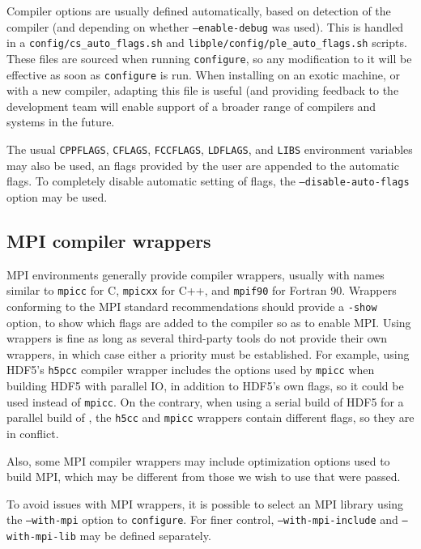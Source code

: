 \documentclass[a4paper,10pt,twoside]{csshortdoc}
\begin{document}
Compiler options are usually defined automatically, based on
detection of the compiler (and depending on whether \texttt{--enable-debug}
was used). This is handled in a \texttt{config/cs\_auto\_flags.sh}
and \texttt{libple/config/ple\_auto\_flags.sh} scripts.
These files are sourced when running \texttt{configure}, so
any modification to it will be effective as soon as \texttt{configure} is run.
When installing on an exotic machine, or with a new compiler, adapting this
file is useful (and providing feedback to the \CS development team
will enable support of a broader range of compilers and systems in the
future.

The usual \texttt{CPPFLAGS}, \texttt{CFLAGS},
\texttt{FCCFLAGS}, \texttt{LDFLAGS}, and \texttt{LIBS} environment variables
may also be used, an flags provided by the user are appended to the automatic
flags. To completely disable automatic setting of flags,
the \texttt{--disable-auto-flags} option may be used.

\subsection{MPI compiler wrappers\label{sec:config:mpicc}}

MPI environments generally provide compiler wrappers, usually
with names similar to \texttt{mpicc} for C, \texttt{mpicxx} for C++,
and \texttt{mpif90} for Fortran 90. Wrappers conforming to the
MPI standard recommendations should provide a \texttt{-show}
option, to show which flags are added to the compiler so as to
enable MPI. Using wrappers is fine as long as several third-party tools
do not provide their own wrappers, in which case either
a priority must be established. For example, using HDF5's
\texttt{h5pcc} compiler wrapper includes the options used by
\texttt{mpicc} when building HDF5 with parallel IO, in addition to
HDF5's own flags, so it could be used instead of \texttt{mpicc}.
On the contrary, when using a serial build of HDF5 for a parallel
build of \CS, the \texttt{h5cc} and \texttt{mpicc} wrappers
contain different flags, so they are in conflict.

Also, some MPI compiler wrappers may include optimization options
used to build MPI, which may be different from those we wish to use
that were passed.

To avoid issues with MPI wrappers, it is possible to select an
MPI library using the \texttt{--with-mpi} option to \texttt{configure}.
For finer control, \texttt{--with-mpi-include} and \texttt{--with-mpi-lib}
may be defined separately.
\end{document}
